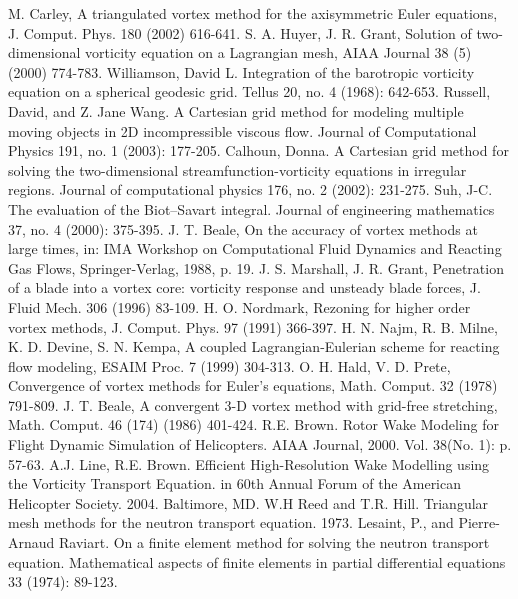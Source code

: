 \documentclass[letterpaper,12pt]{report}
\begin{document}
\begin{thebibliography}{8}
M. Carley, A triangulated vortex method for the axisymmetric Euler equations, J. Comput. Phys. 180 (2002) 616-641.
S. A. Huyer, J. R. Grant, Solution of two-dimensional vorticity equation on a Lagrangian mesh, AIAA Journal 38 (5) (2000) 774-783.
Williamson, David L. Integration of the barotropic vorticity equation on a spherical geodesic grid. Tellus 20, no. 4 (1968): 642-653.
Russell, David, and Z. Jane Wang. A Cartesian grid method for modeling multiple moving objects in 2D incompressible viscous flow. Journal of Computational Physics 191, no. 1 (2003): 177-205.
Calhoun, Donna. A Cartesian grid method for solving the two-dimensional streamfunction-vorticity equations in irregular regions. Journal of computational physics 176, no. 2 (2002): 231-275.
Suh, J-C. The evaluation of the Biot–Savart integral. Journal of engineering mathematics 37, no. 4 (2000): 375-395.
J. T. Beale, On the accuracy of vortex methods at large times, in: IMA Workshop on Computational Fluid Dynamics and Reacting Gas Flows, Springer-Verlag, 1988, p. 19.
J. S. Marshall, J. R. Grant, Penetration of a blade into a vortex core: vorticity response and unsteady blade forces, J. Fluid Mech. 306 (1996) 83-109.
H. O. Nordmark, Rezoning for higher order vortex methods, J. Comput. Phys. 97 (1991) 366-397.
H. N. Najm, R. B. Milne, K. D. Devine, S. N. Kempa, A coupled Lagrangian-Eulerian scheme for reacting flow modeling, ESAIM Proc. 7 (1999) 304-313.
O. H. Hald, V. D. Prete, Convergence of vortex methods for Euler's equations, Math. Comput. 32 (1978) 791-809.
J. T. Beale, A convergent 3-D vortex method with grid-free stretching, Math. Comput. 46 (174) (1986) 401-424.
 R.E. Brown. Rotor Wake Modeling for Flight Dynamic Simulation of Helicopters. AIAA Journal, 2000. Vol. 38(No. 1): p. 57-63.
A.J. Line, R.E. Brown. Efficient High-Resolution Wake Modelling using the Vorticity Transport Equation. in 60th Annual Forum of the American Helicopter Society. 2004. Baltimore, MD.
W.H Reed and T.R. Hill. Triangular mesh methods for the neutron transport equation. 1973.
Lesaint, P., and Pierre-Arnaud Raviart. On a finite element method for solving the neutron transport equation. Mathematical aspects of finite elements in partial differential equations 33 (1974): 89-123.

\end{thebibliography}
\end{document}
